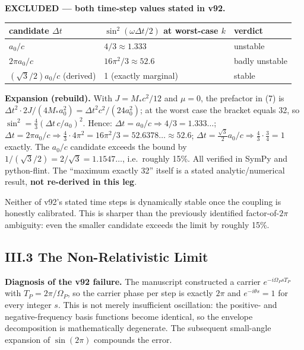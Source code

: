 \documentclass[11pt,a4paper]{article}
\newcommand{\expansion}[1]{\par\smallskip\noindent\textbf{Expansion (rebuild).} #1\par\smallskip}
\begin{document}
\textbf{EXCLUDED --- both time-step values stated in v92.}
\begin{center}
\begin{tabular}{lll}
\toprule
candidate $\Delta t$ & $\sin^2(\omega\Delta t/2)$ at worst-case $k$ & verdict \\
\midrule
$a_0/c$ & $4/3 \approx 1.333$ & unstable \\
$2\pi a_0/c$ & $16\pi^2/3 \approx 52.6$ & badly unstable \\
$(\sqrt{3}/2)a_0/c$ (derived) & 1 (exactly marginal) & stable \\
\bottomrule
\end{tabular}
\end{center}
\expansion{With $J = M_*c^2/12$ and $\mu = 0$, the prefactor in (7) is $\Delta t^2\cdot 2J/(4M_*a_0^2) = \Delta t^2c^2/(24a_0^2)$; at the worst case the bracket equals 32, so $\sin^2 = \tfrac{4}{3}(\Delta t\,c/a_0)^2$. Hence: $\Delta t = a_0/c \Rightarrow 4/3 = 1.333\ldots$; $\Delta t = 2\pi a_0/c \Rightarrow \tfrac{4}{3}\cdot 4\pi^2 = 16\pi^2/3 = 52.6378\ldots \approx 52.6$; $\Delta t = \tfrac{\sqrt{3}}{2}a_0/c \Rightarrow \tfrac{4}{3}\cdot\tfrac{3}{4} = 1$ exactly. The $a_0/c$ candidate exceeds the bound by $1/(\sqrt{3}/2) = 2/\sqrt{3} = 1.1547\ldots$, i.e.\ roughly 15\%. All verified in SymPy and python-flint. The ``maximum exactly 32'' itself is a stated analytic/numerical result, \textbf{not re-derived in this leg}.}
Neither of v92's stated time steps is dynamically stable once the coupling is honestly calibrated. This is sharper than the previously identified factor-of-$2\pi$ ambiguity: even the smaller candidate exceeds the limit by roughly 15\%.

\subsection{III.3 The Non-Relativistic Limit}
\textbf{Diagnosis of the v92 failure.} The manuscript constructed a carrier $e^{-i\Omega_P sT_P}$ with $T_P = 2\pi/\Omega_P$, so the carrier phase per step is exactly $2\pi$ and $e^{-i\theta s} = 1$ for every integer $s$. This is not merely insufficient oscillation: the positive- and negative-frequency basis functions become identical, so the envelope decomposition is mathematically degenerate. The subsequent small-angle expansion of $\sin(2\pi)$ compounds the error.
\end{document}
